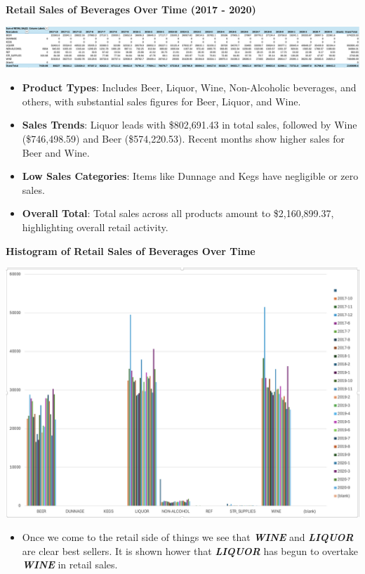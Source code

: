 \documentclass[
  letterpaper,
  DIV=11,
  numbers=noendperiod]{scrreprt}
\providecommand{\tightlist}{%
  \setlength{\itemsep}{0pt}\setlength{\parskip}{0pt}}\usepackage{longtable,booktabs,array}
\begin{document}
\textbf{Retail Sales of Beverages Over Time (2017 - 2020)}

\includegraphics{pivot2_table.png}

\begin{itemize}
\tightlist
\item
  \textbf{Product Types}: Includes Beer, Liquor, Wine, Non-Alcoholic
  beverages, and others, with substantial sales figures for Beer,
  Liquor, and Wine.
\item
  \textbf{Sales Trends}: Liquor leads with \$802,691.43 in total sales,
  followed by Wine (\$746,498.59) and Beer (\$574,220.53). Recent months
  show higher sales for Beer and Wine.
\item
  \textbf{Low Sales Categories}: Items like Dunnage and Kegs have
  negligible or zero sales.
\item
  \textbf{Overall Total}: Total sales across all products amount to
  \$2,160,899.37, highlighting overall retail activity.
\end{itemize}

\textbf{Histogram of Retail Sales of Beverages Over Time}

\includegraphics{pivot_chart_2.png}

\begin{itemize}
\tightlist
\item
  Once we come to the retail side of things we see that
  \textbf{\emph{WINE}} and \textbf{\emph{LIQUOR}} are clear best
  sellers. It is shown hower that \textbf{\emph{LIQUOR}} has begun to
  overtake \textbf{\emph{WINE}} in retail sales.
\end{itemize}
\end{document}
